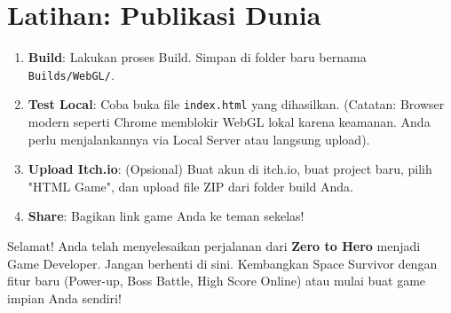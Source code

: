 
\section{Latihan: Publikasi Dunia}

\begin{enumerate}
    \item \textbf{Build}: Lakukan proses Build. Simpan di folder baru bernama \texttt{Builds/WebGL/}.
    \item \textbf{Test Local}: Coba buka file \texttt{index.html} yang dihasilkan. (Catatan: Browser modern seperti Chrome memblokir WebGL lokal karena keamanan. Anda perlu menjalankannya via Local Server atau langsung upload).
    \item \textbf{Upload Itch.io}: (Opsional) Buat akun di itch.io, buat project baru, pilih "HTML Game", dan upload file ZIP dari folder build Anda.
    \item \textbf{Share}: Bagikan link game Anda ke teman sekelas!
\end{enumerate}

Selamat! Anda telah menyelesaikan perjalanan dari \textbf{Zero to Hero} menjadi Game Developer.
Jangan berhenti di sini. Kembangkan Space Survivor dengan fitur baru (Power-up, Boss Battle, High Score Online) atau mulai buat game impian Anda sendiri!
